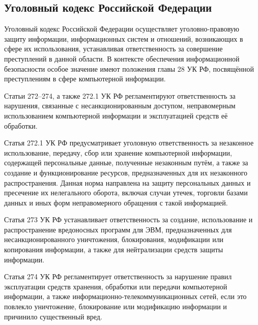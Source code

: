 \subsection{Уголовный кодекс Российской Федерации}

Уголовный кодекс Российской Федерации \cite{UKRF} осуществляет уголовно-правовую защиту информации, информационных систем и отношений, возникающих в сфере их использования, устанавливая ответственность за совершение преступлений в данной области. В контексте обеспечения информационной безопасности особое значение имеют положения главы 28 УК РФ, посвящённой преступлениям в сфере компьютерной информации.

Статьи 272–274, а также 272.1 УК РФ регламентируют ответственность за нарушения, связанные с несанкционированным доступом, неправомерным использованием компьютерной информации и эксплуатацией средств её обработки.

Статья 272.1 УК РФ предусматривает уголовную ответственность за незаконное использование, передачу, сбор или хранение компьютерной информации, содержащей персональные данные, полученные незаконным путём, а также за создание и функционирование ресурсов, предназначенных для их незаконного распространения. Данная норма направлена на защиту персональных данных и пресечение их нелегального оборота, включая случаи утечек, торговли базами данных и иных форм неправомерного обращения с такой информацией.

Статья 273 УК РФ устанавливает ответственность за создание, использование и распространение вредоносных программ для ЭВМ, предназначенных для несанкционированного уничтожения, блокирования, модификации или копирования информации, а также для нейтрализации средств защиты информации.

Статья 274 УК РФ регламентирует ответственность за нарушение правил эксплуатации средств хранения, обработки или передачи компьютерной информации, а также информационно-телекоммуникационных сетей, если это повлекло уничтожение, блокирование или модификацию информации и причинило существенный вред.